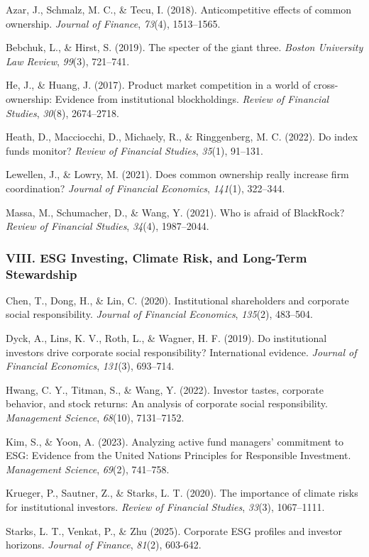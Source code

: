 \documentclass[
  12pt,
  letterpaper,
  DIV=11,
  numbers=noendperiod]{scrartcl}
\begin{document}
Azar, J., Schmalz, M. C., \& Tecu, I. (2018). Anticompetitive effects of
common ownership. \emph{Journal of Finance}, \emph{73}(4), 1513--1565.

Bebchuk, L., \& Hirst, S. (2019). The specter of the giant three.
\emph{Boston University Law Review}, \emph{99}(3), 721--741.

He, J., \& Huang, J. (2017). Product market competition in a world of
cross-ownership: Evidence from institutional blockholdings. \emph{Review
of Financial Studies}, \emph{30}(8), 2674--2718.

Heath, D., Macciocchi, D., Michaely, R., \& Ringgenberg, M. C. (2022).
Do index funds monitor? \emph{Review of Financial Studies},
\emph{35}(1), 91--131.

Lewellen, J., \& Lowry, M. (2021). Does common ownership really increase
firm coordination? \emph{Journal of Financial Economics}, \emph{141}(1),
322--344.

Massa, M., Schumacher, D., \& Wang, Y. (2021). Who is afraid of
BlackRock? \emph{Review of Financial Studies}, \emph{34}(4), 1987--2044.

\subsubsection{VIII. ESG Investing, Climate Risk, and Long-Term
Stewardship}\label{viii.-esg-investing-climate-risk-and-long-term-stewardship}

Chen, T., Dong, H., \& Lin, C. (2020). Institutional shareholders and
corporate social responsibility. \emph{Journal of Financial Economics},
\emph{135}(2), 483--504.

Dyck, A., Lins, K. V., Roth, L., \& Wagner, H. F. (2019). Do
institutional investors drive corporate social responsibility?
International evidence. \emph{Journal of Financial Economics},
\emph{131}(3), 693--714.

Hwang, C. Y., Titman, S., \& Wang, Y. (2022). Investor tastes, corporate
behavior, and stock returns: An analysis of corporate social
responsibility. \emph{Management Science}, \emph{68}(10), 7131--7152.

Kim, S., \& Yoon, A. (2023). Analyzing active fund managers' commitment
to ESG: Evidence from the United Nations Principles for Responsible
Investment. \emph{Management Science}, \emph{69}(2), 741--758.

Krueger, P., Sautner, Z., \& Starks, L. T. (2020). The importance of
climate risks for institutional investors. \emph{Review of Financial
Studies}, \emph{33}(3), 1067--1111.

Starks, L. T., Venkat, P., \& Zhu (2025). Corporate ESG profiles and
investor horizons. \emph{Journal of Finance}, \emph{81}(2), 603-642.
\end{document}
